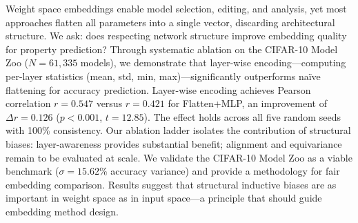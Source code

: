 Weight space embeddings enable model selection, editing, and analysis, yet most approaches flatten all parameters into a single vector, discarding architectural structure. We ask: does respecting network structure improve embedding quality for property prediction? Through systematic ablation on the CIFAR-10 Model Zoo ($N = 61{,}335$ models), we demonstrate that layer-wise encoding---computing per-layer statistics (mean, std, min, max)---significantly outperforms na\"ive flattening for accuracy prediction. Layer-wise encoding achieves Pearson correlation $r = 0.547$ versus $r = 0.421$ for Flatten+MLP, an improvement of $\Delta r = 0.126$ ($p < 0.001$, $t = 12.85$). The effect holds across all five random seeds with 100\% consistency. Our ablation ladder isolates the contribution of structural biases: layer-awareness provides substantial benefit; alignment and equivariance remain to be evaluated at scale. We validate the CIFAR-10 Model Zoo as a viable benchmark ($\sigma = 15.62\%$ accuracy variance) and provide a methodology for fair embedding comparison. Results suggest that structural inductive biases are as important in weight space as in input space---a principle that should guide embedding method design.
